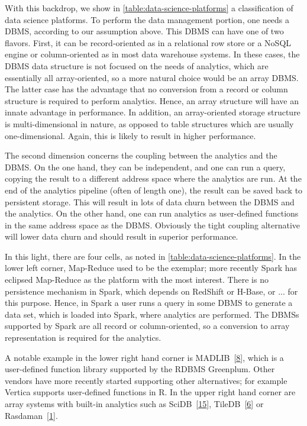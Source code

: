 \documentclass[b5paper,11pt,twoside,openright]{book}
\begin{document}
With this backdrop, we show in \autoref{table:data-science-platforms} a classification of data science
platforms. To perform the data management portion, one needs a DBMS,
according to our assumption above. This DBMS can have one of two
flavors. First, it can be record-oriented as in a relational row store
or a NoSQL engine or column-oriented as in most data warehouse systems.
In these cases, the DBMS data structure is not focused on the needs of
analytics, which are essentially all array-oriented, so a more natural
choice would be an array DBMS. The latter case has the advantage that no
conversion from a record or column structure is required to perform
analytics. Hence, an array structure will have an innate advantage in
performance. In addition, an array-oriented storage structure is
multi-dimensional in nature, as opposed to table structures which are
usually one-dimensional. Again, this is likely to result in higher
performance.

The second dimension concerns the coupling between the analytics and the
DBMS. On the one hand, they can be independent, and one can run a query,
copying the result to a different address space where the analytics are
run. At the end of the analytics pipeline (often of length one), the
result can be saved back to persistent storage. This will result in lots
of data churn between the DBMS and the analytics. On the other hand, one
can run analytics as user-defined functions in the same address space as
the DBMS. Obviously the tight coupling alternative will lower data churn
and should result in superior performance.

In this light, there are four cells, as noted in \autoref{table:data-science-platforms}. In the lower
left corner, Map-Reduce used to be the exemplar; more recently Spark has
eclipsed Map-Reduce as the platform with the most interest. There is no
persistence mechanism in Spark, which depends on RedShift or H-Base, or
... for this purpose. Hence, in Spark a user runs a query in some DBMS
to generate a data set, which is loaded into Spark, where analytics are
performed. The DBMSs supported by Spark are all record or
column-oriented, so a conversion to array representation is required for
the analytics.

A notable example in the lower right hand corner is
MADLIB~{{[}\protect\hyperlink{ref-madlib}{8}{]}}, which is a
user-defined function library supported by the RDBMS Greenplum. Other
vendors have more recently started supporting other alternatives; for
example Vertica supports user-defined functions in R. In the upper right
hand corner are array systems with built-in analytics such as
SciDB~{{[}\protect\hyperlink{ref-scidb}{15}{]}},
TileDB~{{[}\protect\hyperlink{ref-bigdawg}{6}{]}} or
Rasdaman~{{[}\protect\hyperlink{ref-rasdaman}{1}{]}}.
\end{document}
